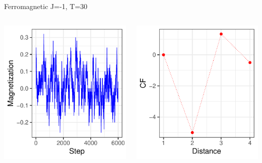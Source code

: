 \documentclass{beamer}
\begin{document}
\begin{frame}{Ferromagnetic J=-1, T=30}
\begin{columns}
\begin{column}{0.5\textwidth}
    \begin{center}
     \includegraphics[width=\textwidth]{Pic/J-1_10_6000_T=30_Magnetization.pdf}
     \end{center}
\end{column}
\begin{column}{0.5\textwidth}
    \begin{center}
     \includegraphics[width=\textwidth]{Pic/J-1_10_6000_T=30_CORRELATION.pdf}

\end{center}
\end{column}
\end{columns}
\end{frame}
\end{document}
